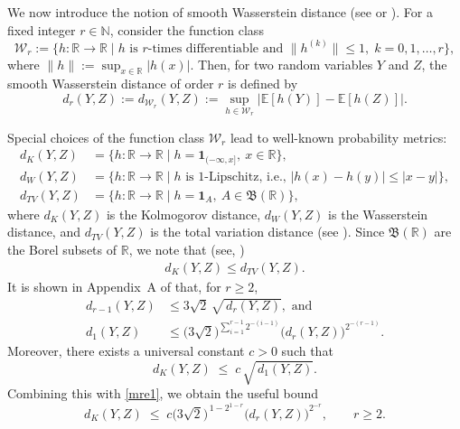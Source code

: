 \documentclass[12pt, a4paper,reqno]{amsart}
\theoremstyle{definition}
\theoremstyle{myremark}
\numberwithin{equation}{section}
\begin{document}
\noindent
We now introduce the notion of smooth Wasserstein distance (see \cite{k0} or \cite{MS001}). For a fixed integer $r \in \mathbb{N}$, consider the function class
\begin{equation}\label{fs1}
\mathcal{W}_r := 
\Big\{ h:\mathbb{R}\to \mathbb{R} \;\Big|\; 
    h \text{ is $r$-times differentiable and } 
    \|h^{(k)}\| \leq 1,\; k=0,1,\ldots,r 
\Big\},
\end{equation}
where $\|h\| := \sup_{x \in \mathbb{R}} |h(x)|$. Then, for two random variables $Y$ and $Z$, the smooth Wasserstein distance of order $r$ is defined by
\begin{equation}\label{smwdis}
  d_r(Y,Z):=d_{\mathcal{W}_r}(Y,Z)
   := \sup_{h \in \mathcal{W}_r} 
      \left|\mathbb{E}[h(Y)] - \mathbb{E}[h(Z)]\right|.  
\end{equation}

Special choices of the function class $\mathcal{W}_r$ lead to well-known probability metrics:
\begin{align*}
 d_K(Y,Z) 
   &= \Big\{h:\mathbb{R}\to \mathbb{R} \;\big|\; 
          h=\mathbf{1}_{(-\infty, x]},~ x \in \mathbb{R}\Big\}, \\[0.3em]
 d_W(Y,Z)  &= \Big\{h:\mathbb{R}\to \mathbb{R} \;\big|\; 
          h \text{ is 1-Lipschitz, i.e., } |h(x)-h(y)| \leq |x-y| \Big\},\\[0.3em]
      d_{TV}(Y,Z)&=\Big\{h:\mathbb{R}\to \mathbb{R} \;\big|\; 
          h=\mathbf{1}_{A},~ A \in \mathfrak{B} (\mathbb{R})\Big\},
\end{align*}
where $d_K(Y,Z)$ is the Kolmogorov distance,  
$d_W(Y,Z)$ is the Wasserstein distance, and $d_{TV}(Y,Z)$ is  the total variation distance (see \cite{k0}). Since $\mathfrak{B} (\mathbb{R})$ are the Borel subsets of $\mathbb{R}$, we note that (see, \cite[Lecture 2]{Chatterjee2007})
\begin{align}\label{reltvk}
d_K(Y,Z) \leq d_{TV}(Y,Z).
\end{align}
\noindent
It is shown in Appendix~A of \cite{k0} that, for $r \geq 2$,
\begin{align}\label{ineq1}
d_{r-1}(Y,Z) &\leq 3\sqrt{2}\, \sqrt{\,d_r(Y,Z)}, \text{ and}\\
d_{1}(Y,Z) &\leq 
    \Big(3\sqrt{2}\Big)^{\sum_{i=1}^{r-1} 2^{-(i-1)}} 
    \Big(d_r(Y,Z)\Big)^{2^{-(r-1)}}.
    \label{mre1}
\end{align}
\noindent
Moreover, there exists a universal constant $c>0$ such that
\[
d_{K}(Y,Z) \;\leq\; c\, \sqrt{\,d_{1}(Y,Z)}.
\]
Combining this with \eqref{mre1}, we obtain the useful bound
\[
d_{K}(Y,Z) 
   \;\leq\; 
   c \Big(3\sqrt{2}\Big)^{\,1-2^{1-r}}
   \Big(d_r(Y,Z)\Big)^{2^{-r}}, 
   \qquad r \geq 2.
\]
\end{document}
